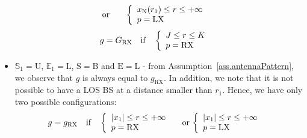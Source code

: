 \documentclass[10pt,journal,a4paper]{IEEEtran}
\begin{document}
\begin{itemize}
\begin{eqnarray}
			&\text{or}&\quad\left\{ 
			\begin{array}{l l}
				x_\mathrm{N}(r_1) \leq r \leq +\infty & \\
				p = \mathrm{LX} & 
				\end{array} \right.
	\end{eqnarray} 
\begin{equation}
		g = G_\mathrm{RX} \quad \text{if} \quad \left\{ 
			\begin{array}{l l}
				J \leq r \leq K & \\
				p = \mathrm{RX} & 
				\end{array} \right.
	\end{equation}
\item $\mathbb{S}_1 = \mathrm{U}$, $\mathbb{E}_1 = \mathrm{L}$, $\mathrm{S} = \mathrm{B}$ and $\mathrm{E} = \mathrm{L}$ - from Assumption~\ref{ass.antennaPattern}, we observe that $g$ is always equal to $g_\mathrm{RX}$. In addition, we note that it is not possible to have a LOS BS at a distance smaller than $r_1$. Hence, we have only two possible configurations:
\begin{equation}\label{eq.p1.ext1}
		\hspace{-5mm}g = g_\mathrm{RX} \quad \text{if} \quad \left\{ 
			\begin{array}{l l}
				|x_1| \leq r \leq +\infty & \\
				p = \mathrm{RX} & 
				\end{array} \right. \,\text{or}\, \left\{ 
			\begin{array}{l l}
				|x_1| \leq r \leq +\infty & \\
				p = \mathrm{LX} & 
				\end{array} \right.\hspace{-5mm}
\end{equation}


\end{itemize}
\end{document}
